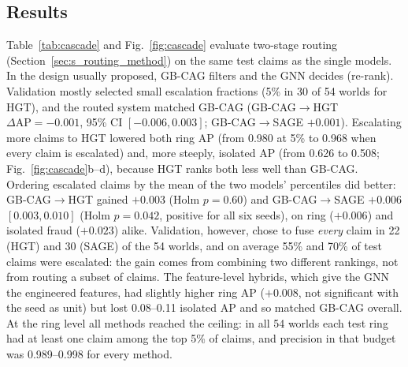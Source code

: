 \documentclass[pdflatex,sn-vancouver-num]{sn-jnl}
\begin{document}
\subsection{Results}\label{sec:s_routing_results}
Table~\ref{tab:cascade} and Fig.~\ref{fig:cascade} evaluate two-stage
routing (Section~\ref{sec:s_routing_method}) on the same test claims as the single
models. In the design usually proposed, GB-CAG filters and the GNN decides
(re-rank). Validation mostly selected small escalation fractions (5\% in 30
of 54 worlds for HGT), and the routed system matched GB-CAG (GB-CAG$\to$HGT
$\Delta\text{AP}=-0.001$, 95\% CI $[-0.006, 0.003]$; GB-CAG$\to$SAGE
$+0.001$). Escalating more claims to HGT lowered both ring AP (from 0.980 at
5\% to 0.968 when every claim is escalated) and, more steeply, isolated AP
(from 0.626 to 0.508; Fig.~\ref{fig:cascade}b--d), because HGT ranks both
less well than GB-CAG. Ordering escalated claims by the mean of the two models' percentiles
did better: GB-CAG$\to$HGT gained $+0.003$ (Holm $p=0.60$) and
GB-CAG$\to$SAGE $+0.006$ $[0.003, 0.010]$ (Holm $p=0.042$, positive for all
six seeds), on ring ($+0.006$) and isolated fraud ($+0.023$) alike. Validation, however, chose to fuse
\emph{every} claim in 22 (HGT) and 30 (SAGE) of the 54 worlds, and on average
55\% and 70\% of test claims were escalated: the gain comes from combining two
different rankings, not from routing a subset of claims. The feature-level
hybrids, which give the GNN the engineered features, had slightly higher
ring AP ($+0.008$, not significant with the seed as unit) but lost
0.08--0.11 isolated AP and so matched GB-CAG overall. At the ring level all
methods reached the ceiling: in all 54 worlds each test ring had at least one
claim among the top 5\% of claims, and precision in that budget was
0.989--0.998 for every method.
\end{document}
